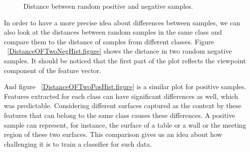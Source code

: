 



\begin{figure}[t]
  \caption[Distance of Positive and Negative samples]
  {Distance between random positive and negative samples.}
  \label{DistanceOFPosandNegHist.figure}
\end{figure}

In order to have a more precise idea about differences between samples, we can also look at the distances between random samples
in the same class and compare them to the distance of samples from different classes. 
Figure ~\ref{DistanceOFTwoNegHist.figure} shows the distance in two random negative samples. 
It should be noticed that the first part of the plot reflects the viewpoint component of the feature vector.
 


And figure ~\ref{DistanceOFTwoPosHist.figure} is a similar plot for positive samples. 
Features extracted for each class can have significant differences as well, which was predictable. 
Considering different surfaces captured as the context by these features that can belong to the same class causes these differences. 
A positive sample can represent, for instance, the surface of a table or a wall or the meeting region of these 
two surfaces. 
This comparison gives us an idea about how challenging it is to train a classifier for such data.

